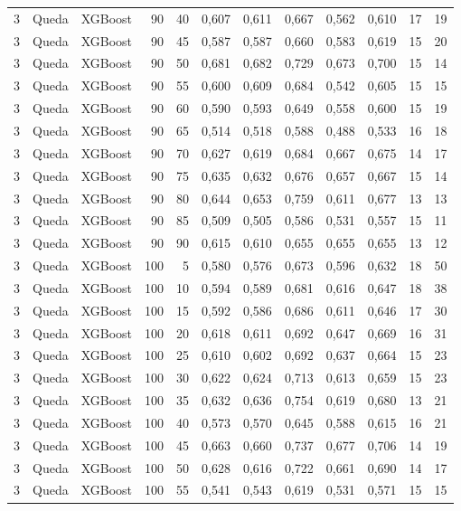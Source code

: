 \begin{longtable}{@{}rllrrrrrrrrr@{}}
3 & Queda & XGBoost & 90 & 40 & 0,607 & 0,611 & 0,667 & 0,562 & 0,610 & 17 & 19 \\
3 & Queda & XGBoost & 90 & 45 & 0,587 & 0,587 & 0,660 & 0,583 & 0,619 & 15 & 20 \\
3 & Queda & XGBoost & 90 & 50 & 0,681 & 0,682 & 0,729 & 0,673 & 0,700 & 15 & 14 \\
3 & Queda & XGBoost & 90 & 55 & 0,600 & 0,609 & 0,684 & 0,542 & 0,605 & 15 & 15 \\
3 & Queda & XGBoost & 90 & 60 & 0,590 & 0,593 & 0,649 & 0,558 & 0,600 & 15 & 19 \\
3 & Queda & XGBoost & 90 & 65 & 0,514 & 0,518 & 0,588 & 0,488 & 0,533 & 16 & 18 \\
3 & Queda & XGBoost & 90 & 70 & 0,627 & 0,619 & 0,684 & 0,667 & 0,675 & 14 & 17 \\
3 & Queda & XGBoost & 90 & 75 & 0,635 & 0,632 & 0,676 & 0,657 & 0,667 & 15 & 14 \\
3 & Queda & XGBoost & 90 & 80 & 0,644 & 0,653 & 0,759 & 0,611 & 0,677 & 13 & 13 \\
3 & Queda & XGBoost & 90 & 85 & 0,509 & 0,505 & 0,586 & 0,531 & 0,557 & 15 & 11 \\
3 & Queda & XGBoost & 90 & 90 & 0,615 & 0,610 & 0,655 & 0,655 & 0,655 & 13 & 12 \\
3 & Queda & XGBoost & 100 & 5 & 0,580 & 0,576 & 0,673 & 0,596 & 0,632 & 18 & 50 \\
3 & Queda & XGBoost & 100 & 10 & 0,594 & 0,589 & 0,681 & 0,616 & 0,647 & 18 & 38 \\
3 & Queda & XGBoost & 100 & 15 & 0,592 & 0,586 & 0,686 & 0,611 & 0,646 & 17 & 30 \\
3 & Queda & XGBoost & 100 & 20 & 0,618 & 0,611 & 0,692 & 0,647 & 0,669 & 16 & 31 \\
3 & Queda & XGBoost & 100 & 25 & 0,610 & 0,602 & 0,692 & 0,637 & 0,664 & 15 & 23 \\
3 & Queda & XGBoost & 100 & 30 & 0,622 & 0,624 & 0,713 & 0,613 & 0,659 & 15 & 23 \\
3 & Queda & XGBoost & 100 & 35 & 0,632 & 0,636 & 0,754 & 0,619 & 0,680 & 13 & 21 \\
3 & Queda & XGBoost & 100 & 40 & 0,573 & 0,570 & 0,645 & 0,588 & 0,615 & 16 & 21 \\
3 & Queda & XGBoost & 100 & 45 & 0,663 & 0,660 & 0,737 & 0,677 & 0,706 & 14 & 19 \\
3 & Queda & XGBoost & 100 & 50 & 0,628 & 0,616 & 0,722 & 0,661 & 0,690 & 14 & 17 \\
3 & Queda & XGBoost & 100 & 55 & 0,541 & 0,543 & 0,619 & 0,531 & 0,571 & 15 & 15 \\

\end{longtable}
